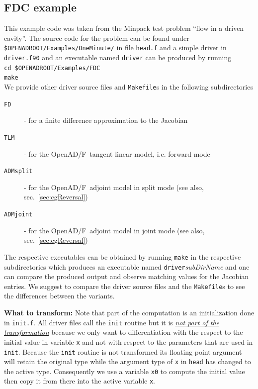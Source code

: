 \documentclass{book}
\newcommand{\OpenADF}{OpenAD/F}
\newcommand{\refsec}[1]{{sec.~\ref{#1}}}
\begin{document}
\subsection{FDC example}\label{sec:fdcExample}
This example code was taken from the Minpack test problem ``flow in a driven cavity''. 
The source code for the problem can be found under \lstinline{$OPENADROOT/Examples/OneMinute/}%
in file \lstinline{head.f} and a simple driver in \lstinline{driver.f90} and an executable named \lstinline{driver} can be 
produced by running\\[1ex] 
\hspace*{.3cm}\lstinline{cd $OPENADROOT/Examples/FDC}\\ %
\hspace*{.3cm}\lstinline{make}\\[1ex]
We provide other driver source files and \lstinline{Makefile}s in the following subdirectories
\begin{description}
\item[\tt FD] - for a finite difference approximation to the Jacobian
\item[\tt TLM] - for the  \OpenADF\ tangent linear model, i.e. forward mode
\item[\tt ADMsplit] - for the \OpenADF\ adjoint model in split mode (see also, \refsec{sec:cgReversal})
\item[\tt ADMjoint] - for the \OpenADF\ adjoint model in joint mode (see also, \refsec{sec:cgReversal})
\end{description}
The respective executables can be obtained by running \lstinline{make} in the respective 
subdirectories which produces an executable named 
\lstinline{driver}{\em subDirName} and one can compare the produced output and observe matching values for the Jacobian entries. 
We suggest to compare the driver source files and the \lstinline{Makefile}s
to see the differences between the variants. 

\noindent
{\bf What to transform:} Note that part of the computation is an initialization done in \lstinline{init.f}. All driver files call 
the \lstinline{init} routine but it is \underline{\em not part of the transformation} because we only want to differentiation 
with the respect to the initial value in variable \lstinline{x} and  not with respect to the parameters that are 
used in \lstinline{init}. Because the \lstinline{init} routine is not transformed its floating point argument will retain 
the original type while the argument type of \lstinline{x} in \lstinline{head} has changed to the active type. 
Consequently we use a variable \lstinline{x0} to compute the initial value then copy it from there into the active variable \lstinline{x}.    
\end{document}
